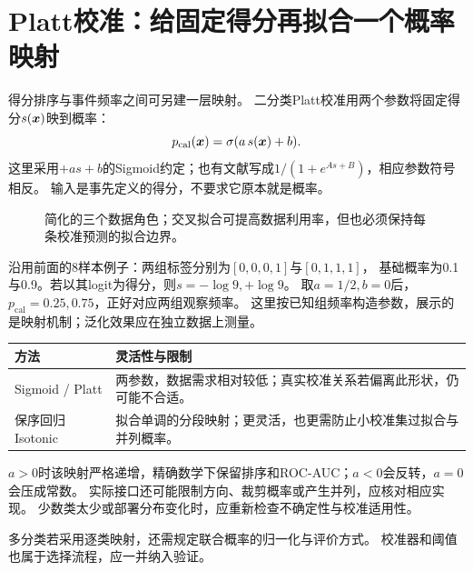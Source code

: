 \section{Platt校准：给固定得分再拟合一个概率映射}
\label{sec:diag-platt}
得分排序与事件频率之间可另建一层映射。
二分类Platt校准用两个参数将固定得分$s(\boldsymbol{x})$映到概率：
\[
 p_{\mathrm{cal}}(\boldsymbol{x})=\sigma(a\,s(\boldsymbol{x})+b).
\]
这里采用$+as+b$的Sigmoid约定；也有文献写成$1/(1+e^{As+B})$，相应参数符号相反。
输入是事先定义的得分，不要求它原本就是概率。

\begin{figure}[htbp]
\centering
\caption{简化的三个数据角色；交叉拟合可提高数据利用率，但也必须保持每条校准预测的拟合边界。}
\par\smallskip
{}
\end{figure}

沿用前面的8样本例子：两组标签分别为$[0,0,0,1]$与$[0,1,1,1]$，
基础概率为0.1与0.9。若以其logit为得分，则$s=-\log9,+\log9$。
取$a=1/2,b=0$后，$p_{\mathrm{cal}}=0.25,0.75$，正好对应两组观察频率。
这里按已知组频率构造参数，展示的是映射机制；泛化效果应在独立数据上测量。

\begin{center}
\begin{tabularx}{\textwidth}{P{31mm}Y}
\toprule
方法 & 灵活性与限制\\
\midrule
Sigmoid / Platt & 两参数，数据需求相对较低；真实校准关系若偏离此形状，仍可能不合适。\\
保序回归 Isotonic & 拟合单调的分段映射；更灵活，也更需防止小校准集过拟合与并列概率。\\
\bottomrule
\end{tabularx}
\end{center}

\begin{pitfall}[映射方向与排序]
$a>0$时该映射严格递增，精确数学下保留排序和ROC-AUC；$a<0$会反转，$a=0$会压成常数。
实际接口还可能限制方向、裁剪概率或产生并列，应核对相应实现。
少数类太少或部署分布变化时，应重新检查不确定性与校准适用性。
\end{pitfall}

多分类若采用逐类映射，还需规定联合概率的归一化与评价方式。
校准器和阈值也属于选择流程，应一并纳入验证。
